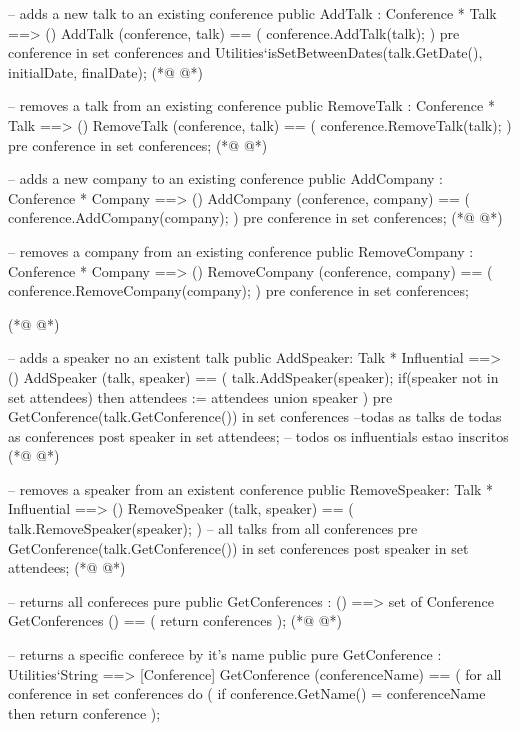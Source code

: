 \begin{vdmpp}[breaklines=true]
  -- adds a new talk to an existing conference
  public AddTalk : Conference * Talk ==> ()
    AddTalk (conference, talk) == (
     conference.AddTalk(talk);
    )
    pre conference in set conferences and
      Utilities`isSetBetweenDates(talk.GetDate(), initialDate, finalDate);
(*@
\label{RemoveTalk:80}
@*)
      
  -- removes a talk from an existing conference
   public RemoveTalk : Conference * Talk ==> ()
    RemoveTalk (conference, talk) == (
     conference.RemoveTalk(talk);
    )
    pre conference in set conferences;
(*@
\label{AddCompany:87}
@*)
      
  -- adds a new company to an existing conference
   public AddCompany : Conference * Company ==> ()
    AddCompany (conference, company) == (
     conference.AddCompany(company);
    )
    pre conference in set conferences;
(*@
\label{RemoveCompany:94}
@*)
    
   -- removes a company from an existing conference
   public RemoveCompany : Conference * Company ==> ()
    RemoveCompany (conference, company) == (
     conference.RemoveCompany(company);
    )
    pre conference in set conferences;
    
(*@
\label{AddSpeaker:102}
@*)
    
   -- adds a speaker no an existent talk
   public AddSpeaker: Talk * Influential ==> ()
    AddSpeaker (talk, speaker) == (
     talk.AddSpeaker(speaker);
     if(speaker not in set attendees)
      then attendees := attendees union {speaker}
    )
    pre GetConference(talk.GetConference()) in set conferences  --todas as talks de todas as conferences
    post speaker in set attendees;  -- todos os influentials estao inscritos
(*@
\label{RemoveSpeaker:112}
@*)
   
   -- removes a speaker from an existent conference
   public RemoveSpeaker: Talk * Influential ==> ()
    RemoveSpeaker (talk, speaker) == (
     talk.RemoveSpeaker(speaker);
    )
    -- all talks from all conferences 
    pre GetConference(talk.GetConference()) in set conferences 
    post speaker in set attendees;
(*@
\label{GetConferences:121}
@*)
    
  -- returns all confereces
  pure public GetConferences : () ==> set of Conference
    GetConferences () == (
     return conferences
    );
(*@
\label{GetConference:127}
@*)
    
  -- returns a specific conferece by it's name
  public pure GetConference : Utilities`String ==> [Conference]
    GetConference (conferenceName) == (
     for all conference in set conferences do (
      if conference.GetName() = conferenceName
      then return conference
     );
     

\end{vdmpp}
